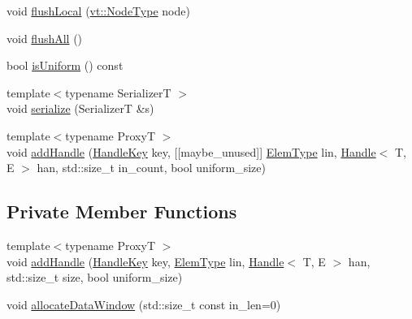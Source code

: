 \begin{DoxyCompactItemize}
\item 
void \hyperlink{structvt_1_1rdma_1_1_holder_a4b576d334034884d7c72b89310fd4f57}{flush\+Local} (\hyperlink{namespacevt_a866da9d0efc19c0a1ce79e9e492f47e2}{vt\+::\+Node\+Type} node)
\item 
void \hyperlink{structvt_1_1rdma_1_1_holder_a667a140d3db4f68da8af0f9d6533a88a}{flush\+All} ()
\item 
bool \hyperlink{structvt_1_1rdma_1_1_holder_af5a5f41fb16fbf8ee0f7f1b51120cb65}{is\+Uniform} () const
\item 
{\footnotesize template$<$typename SerializerT $>$ }\\void \hyperlink{structvt_1_1rdma_1_1_holder_ab01f8e7262a04ba7d86501968e2b177d}{serialize} (SerializerT \&s)
\item 
{\footnotesize template$<$typename ProxyT $>$ }\\void \hyperlink{structvt_1_1rdma_1_1_holder_af2c376f5523ded1fca4df3a809a01395}{add\+Handle} (\hyperlink{structvt_1_1rdma_1_1_handle_key}{Handle\+Key} key, \mbox{[}\mbox{[}maybe\+\_\+unused\mbox{]}\mbox{]} \hyperlink{namespacevt_1_1rdma_a38e310504e675aa1bcaf7811019b0df2}{Elem\+Type} lin, \hyperlink{structvt_1_1rdma_1_1_handle}{Handle}$<$ T, E $>$ han, std\+::size\+\_\+t in\+\_\+count, bool uniform\+\_\+size)
\end{DoxyCompactItemize}
\subsection*{Private Member Functions}
\begin{DoxyCompactItemize}
\item 
{\footnotesize template$<$typename ProxyT $>$ }\\void \hyperlink{structvt_1_1rdma_1_1_holder_ab5feb3bca7aad2b37c7249f3abf7ab05}{add\+Handle} (\hyperlink{structvt_1_1rdma_1_1_handle_key}{Handle\+Key} key, \hyperlink{namespacevt_1_1rdma_a38e310504e675aa1bcaf7811019b0df2}{Elem\+Type} lin, \hyperlink{structvt_1_1rdma_1_1_handle}{Handle}$<$ T, E $>$ han, std\+::size\+\_\+t size, bool uniform\+\_\+size)
\item 
void \hyperlink{structvt_1_1rdma_1_1_holder_a7dc5e735fb6f919dabec8e118683b4ae}{allocate\+Data\+Window} (std\+::size\+\_\+t const in\+\_\+len=0)
\end{DoxyCompactItemize}
